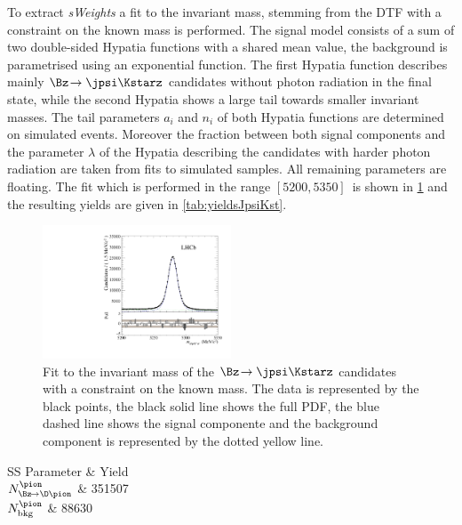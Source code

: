 To extract \emph{sWeights} a fit to the invariant \Bz mass, stemming from the DTF with a constraint on the known \jpsi mass is performed.
The signal model consists of a sum of two double-sided Hypatia functions with a shared mean value, the background is parametrised using an exponential function.
The first Hypatia function describes mainly $\Bz\!\to\jpsi\Kstarz$ candidates without photon radiation in the final state, while the second Hypatia shows a large tail towards smaller invariant masses.
The tail parameters $a_i$ and $n_i$ of both Hypatia functions are determined on simulated events.
Moreover the fraction between both signal components and the parameter $\lambda$ of the Hypatia describing the \Bz candidates with harder photon radiation are taken from fits to simulated samples.
All remaining parameters are floating.
The fit which is performed in the range $[5200, 5350]\,$\si[per-mode=symbol]{\MeVcc} is shown in \cref{fig:massFitJpsiKst} and the resulting yields are given in \cref{tab:yieldsJpsiKst}.
\begin{figure}[tbp]
    \centering
    \includegraphics[width=0.5\textwidth]{08FlavourTagging/figs/BmassJpsiKst_pull.pdf}
    \caption{Fit to the invariant mass of the $\Bz\!\to\jpsi\Kstarz$ candidates with a constraint on the known \jpsi mass.
    The data is represented by the black points, the black solid line shows the full PDF, the blue dashed line shows the signal componente and the background component is represented by the dotted yellow line.}
    \label{fig:massFitJpsiKst}
\end{figure}
\begin{table}[tbp]
	\centering
	\caption{Fitted Yields of the $\Bz\!\to\jpsi\Kstarz$ component and the combinatorial background.}
	\begin{tabular}{SS}
		\toprule
		{Parameter} & {Yield} \\
		\midrule
		{$N_{\Bz\!\to\D\pion}^{\pion}$}	& 351507 \\
		{$N_{\text{bkg}}^{\pion}$}		& 88630 \\
		\bottomrule
	\end{tabular}
	\label{tab:yieldsJpsiKst}
\end{table}

